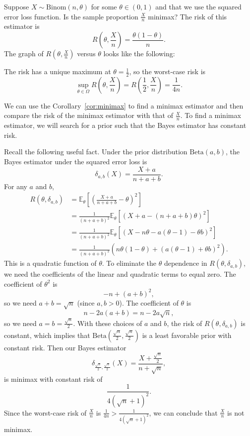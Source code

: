 \begin{exam}
    Suppose $X \sim \text{Binom}(n, \theta)$ for some $\theta \in (0,1)$ and that we use the squared error loss function. Is the sample proportion $\frac{X}{n}$ minimax? The risk of this estimator is
\[
R\left(\theta, \frac{X}{n}\right) = \frac{\theta(1-\theta)}{n}.
\]
The graph of $R\left(\theta, \frac{X}{n}\right)$ versus $\theta$ looks like the following:

The risk has a unique maximum at $\theta = \frac{1}{2}$, so the worst-case risk is
\[
\sup_{\theta \in \Omega} R\left(\theta, \frac{X}{n}\right) = R\left(\frac{1}{2}, \frac{X}{n}\right) = \frac{1}{4n}.
\]

We can use the Corollary~\ref{cor:minimax} to find a minimax estimator and then compare the risk of the minimax estimator with that of $\frac{X}{n}$. To find a minimax estimator, we will search for a prior such that the Bayes estimator has constant risk.

Recall the following useful fact. Under the prior distribution $\text{Beta}(a, b)$, the Bayes estimator under the squared error loss is
\[
\delta_{a,b}(X) = \frac{X + a}{n + a + b}.
\]
For any $a$ and $b$,
\begin{align*}
R(\theta, \delta_{a,b}) &= \mathbb{E}_\theta\left[\left(\frac{X + a}{n + a + b} - \theta\right)^2\right] \\
&= \frac{1}{(n + a + b)^2} \mathbb{E}_\theta\left[(X + a - (n + a + b)\theta)^2\right] \\
&= \frac{1}{(n + a + b)^2} \mathbb{E}_\theta\left[(X - n\theta - a(\theta - 1) - \theta b)^2\right] \\
&= \frac{1}{(n + a + b)^2} \left(n\theta(1 - \theta) + (a(\theta - 1) + \theta b)^2\right).
\end{align*}
This is a quadratic function of $\theta$. To eliminate the $\theta$ dependence in $R(\theta, \delta_{a,b})$, we need the coefficients of the linear and quadratic terms to equal zero. The coefficient of $\theta^2$ is
\[
-n + (a + b)^2,
\]
so we need $a + b = \sqrt{n}$ (since $a, b > 0$). The coefficient of $\theta$ is
\[
n - 2a(a + b) = n - 2a\sqrt{n},
\]
so we need $a = b = \frac{\sqrt{n}}{2}$. With these choices of $a$ and $b$, the risk of $R(\theta, \delta_{a,b})$ is constant, which implies that $\text{Beta}\left(\frac{\sqrt{n}}{2}, \frac{\sqrt{n}}{2}\right)$ is a least favorable prior with constant risk. Then our Bayes estimator
\[
\delta_{\frac{\sqrt{n}}{2}, \frac{\sqrt{n}}{2}}(X) = \frac{X + \frac{\sqrt{n}}{2}}{n + \sqrt{n}},
\]
is minimax with constant risk of
\[
\frac{1}{4(\sqrt{n} + 1)^2}.
\]
Since the worst-case risk of $\frac{X}{n}$ is $\frac{1}{4n} > \frac{1}{4(\sqrt{n}+1)^2}$, we can conclude that $\frac{X}{n}$ is not minimax.
\end{exam}

